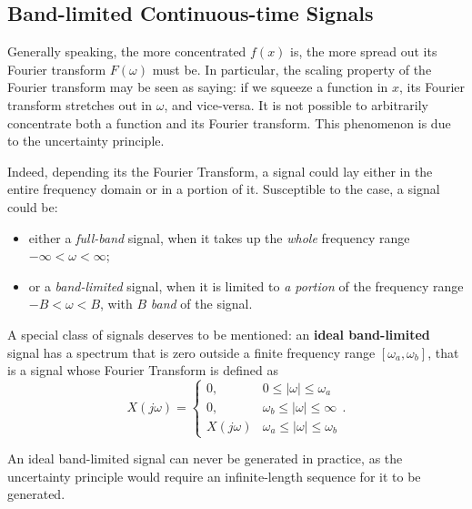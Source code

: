 \documentclass[\documentfontsize, twocolumn]{\classname}
\begin{document}
\subsection{Band-limited Continuous-time Signals}\label{sec:bandLimitedSignals}

Generally speaking, the more concentrated $f(x)$ is, the more spread out its Fourier transform $F(\omega)$ must be. In particular, the scaling property of the Fourier transform may be seen as saying: if we squeeze a function in $x$, its Fourier transform stretches out in $\omega$, and vice-versa. It is not possible to arbitrarily concentrate both a function and its Fourier transform. This phenomenon is due to the uncertainty principle.

Indeed, depending its the Fourier Transform, a signal could lay either in the entire frequency domain or in a portion of it. Susceptible to the case, a signal could be:
\begin{itemize}
    \item either a \emph{full-band} signal, when it takes up the \emph{whole} frequency range $-\infty < \omega < \infty$;
    \item or a \emph{band-limited} signal, when it is limited to \emph{a portion} of the frequency range $-B < \omega < B$, with $B$ \emph{band} of the signal.
\end{itemize}

A special class of signals deserves to be mentioned: an \textbf{ideal band-limited} signal has a spectrum that is zero outside a finite frequency range $[\omega_a, \omega_b]$, that is a signal whose Fourier Transform is defined as
\begin{equation}\label{eqn:idealBandSignal}
    X(j\omega) = \left\{\begin{array}{ll}
        0,  &   0 \leq |\omega| \leq \omega_a\\
        0,  &   \omega_b \leq |\omega| \leq \infty\\
        X(j\omega)  &   \omega_a \leq |\omega| \leq \omega_b
    \end{array}\right..
\end{equation}

An ideal band-limited signal can never be generated in practice, as the uncertainty principle would require an infinite-length sequence for it to be generated.
\end{document}
